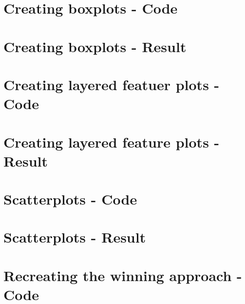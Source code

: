\section{Creating boxplots - Code} %
\label{app:source-boxplots}

\section{Creating boxplots - Result} %
\label{app:result-boxplots}

\section{Creating layered featuer plots - Code} %
\label{app:source-layered-feature-plots}


\section{Creating layered feature plots - Result} %
\label{app:result-layered-feature-plots}


\section{Scatterplots - Code} %
\label{app:source-scatterplots}

\section{Scatterplots - Result} %
\label{app:result-scatterplots}


\section{Recreating the winning approach - Code} %
\label{app:source-recreate-winner}

